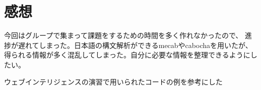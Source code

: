 \documentclass{jarticle}
\begin{document}
\section{感想}
今回はグループで集まって課題をするための時間を多く作れなかったので、
進捗が遅れてしまった。日本語の構文解析ができるmecabやcabochaを用いたが、
得られる情報が多く混乱してしまった。自分に必要な情報を整理できるようにしたい。

\begin{thebibliography}{99}
     ウェブインテリジェンスの演習で用いられたコードの例を参考にした
\end{thebibliography}
\end{document}
